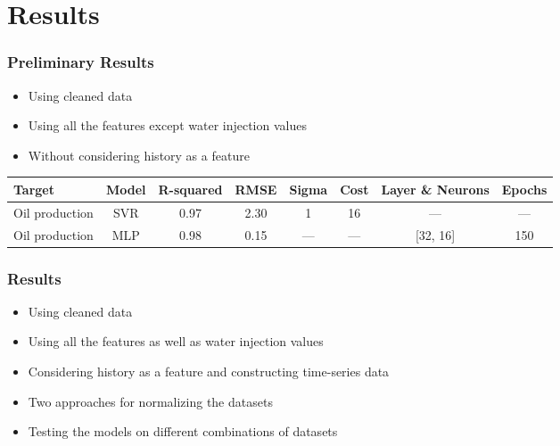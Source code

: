 \documentclass[xcolor=table]{beamer}
\begin{document}
\section{Results}
\begin{frame}
\frametitle{Preliminary Results}
\begin{itemize}
\item Using cleaned data
\item Using all the features except water injection values
\item Without considering history as a feature 
\end{itemize}

\begin{table}
\begin{adjustbox}{width=1\linewidth,center}
\label{tb:rs_adpt}
\begin{tabular}{lccccccc}
\toprule
\textbf{Target}&\textbf{Model}&\textbf{R-squared}&\textbf{RMSE}&\textbf{Sigma}&\textbf{Cost}&\textbf{Layer \& Neurons}&\textbf{Epochs}\tabularnewline
\midrule
Oil production & SVR &0.97 & 2.30 & 1 & 16 & ---&--- \tabularnewline
Oil production & MLP &\cellcolor{green!40}0.98  & 0.15 & --- & --- & [32, 16] & 150 \tabularnewline

\bottomrule
\end{tabular}
\end{adjustbox}
\end{table}

\end{frame}


\begin{frame}
\frametitle{Results}
\begin{itemize}
\item Using cleaned data
\item Using all the features as well as water injection values
\item Considering history as a feature and constructing time-series data 
\item Two approaches for normalizing the datasets
\item Testing the models on different combinations of datasets
\end{itemize}


\end{frame}
\end{document}
